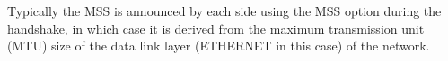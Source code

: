 Typically the MSS is announced by each side using the MSS option during the handshake, in which case it is derived from the maximum transmission unit (MTU) size of the data link layer (ETHERNET in this case) of the network. 